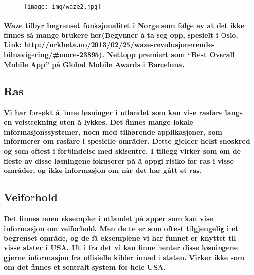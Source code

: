 \begin{figure}[p]
\centering
\texttt{[image: img/waze2.jpg]}
\label{fig:waze2}
\end{figure}

\paragraph{Waze tilbyr begrenset funksjonalitet i Norge som følge av at det ikke finnes så mange brukere her(Begynner å ta seg opp, spesielt i Oslo. Link: http://nrkbeta.no/2013/02/25/waze-revolusjonerende-bilnavigering/#more-23895).
Nettopp premiert som “Best Overall Mobile App” på Global Mobile Awards i Barcelona.}


\subsection{Ras}
\paragraph{Vi har forsøkt å finne løsninger i utlandet som kan vise rasfare langs en veistrekning uten å lykkes. Det finnes mange lokale informasjonssystemer, noen med tilhørende applikasjoner, som informerer om rasfare i spesielle områder. Dette gjelder helst snøskred og som oftest i forbindelse med skisentre. I tillegg virker som om de fleste av disse løsningene fokuserer på å oppgi risiko for ras i visse områder, og ikke informasjon om når det har gått et ras.}

\subsection{Veiforhold}
\paragraph{Det finnes noen eksempler i utlandet på apper som kan vise informasjon om veiforhold. Men dette er som oftest tilgjengelig i et begrenset område, og de få eksemplene vi har funnet er knyttet til visse stater i USA. Ut i fra det vi kan finne henter disse løsningene gjerne informasjon fra offisielle kilder innad i staten. Virker ikke som om det finnes et sentralt system for hele USA.}



